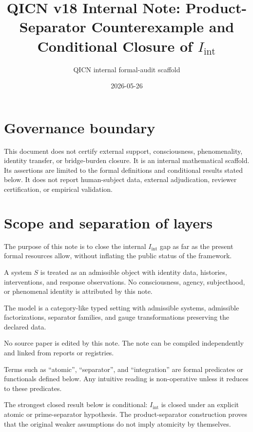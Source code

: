 \documentclass[11pt]{article}
\title{QICN v18 Internal Note: Product-Separator Counterexample and Conditional Closure of $I_{\mathrm{int}}$}
\author{QICN internal formal-audit scaffold}
\date{2026-05-26}
\newcommand{\Iint}{I_{\mathrm{int}}}
\begin{document}
\maketitle

\section*{Governance boundary}
This document does not certify external support, consciousness, phenomenality, identity transfer, or bridge-burden closure. It is an internal mathematical scaffold. Its assertions are limited to the formal definitions and conditional results stated below. It does not report human-subject data, external adjudication, reviewer certification, or empirical validation.

\section{Scope and separation of layers}
The purpose of this note is to close the internal $\Iint$ gap as far as the present formal resources allow, without inflating the public status of the framework.

\begin{description}[leftmargin=2.6cm]
  \item[Ontology.] A system $S$ is treated as an admissible object with identity data, histories, interventions, and response observations. No consciousness, agency, subjecthood, or phenomenal identity is attributed by this note.
  \item[Mathematical model.] The model is a category-like typed setting with admissible systems, admissible factorizations, separator families, and gauge transformations preserving the declared data.
  \item[Implementation.] No source paper is edited by this note. The note can be compiled independently and linked from reports or registries.
  \item[Language.] Terms such as ``atomic'', ``separator'', and ``integration'' are formal predicates or functionals defined below. Any intuitive reading is non-operative unless it reduces to these predicates.
  \item[Interpretation.] The strongest closed result below is conditional: $\Iint$ is closed under an explicit atomic or prime-separator hypothesis. The product-separator construction proves that the original weaker assumptions do not imply atomicity by themselves.
\end{description}
\end{document}
